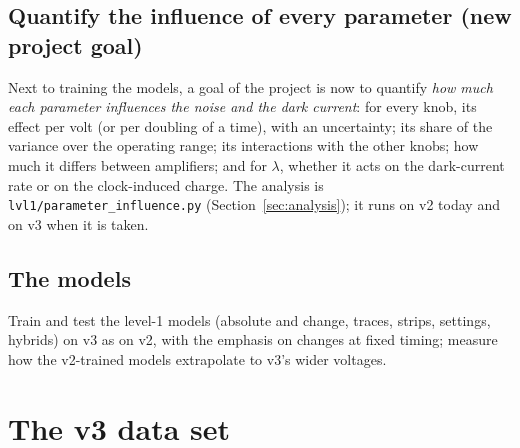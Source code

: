 \documentclass[11pt]{article}
\begin{document}
\subsection{Quantify the influence of every parameter (new project goal)}
Next to training the models, a goal of the project is now to quantify \emph{how much each parameter influences the noise
and the dark current}: for every knob, its effect per volt (or per doubling of a time), with an uncertainty; its share of
the variance over the operating range; its interactions with the other knobs; how much it differs between amplifiers;
and for $\lambda$, whether it acts on the dark-current rate or on the clock-induced charge. The analysis is
\texttt{lvl1/parameter\_influence.py} (Section~\ref{sec:analysis}); it runs on v2 today and on v3 when it is taken.

\subsection{The models}
Train and test the level-1 models (absolute and change, traces, strips, settings, hybrids) on v3 as on v2, with the
emphasis on changes at fixed timing; measure how the v2-trained models extrapolate to v3's wider voltages.

\section{The v3 data set}
\end{document}
